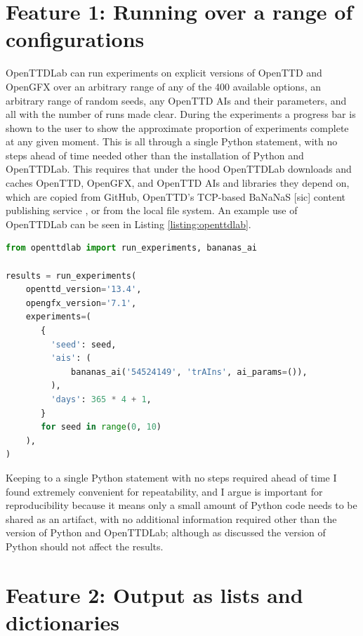 \documentclass[logo,msc,dsti]{style/infthesis}    %
\begin{document}
{\section{Feature 1: Running over a range of configurations}

OpenTTDLab can run experiments on explicit versions of OpenTTD and OpenGFX over an arbitrary range of any of the 400 available options, an arbitrary range of random seeds, any OpenTTD AIs and their parameters, and all with the number of runs made clear. During the experiments a progress bar is shown to the user to show the approximate proportion of experiments complete at any given moment. This is all through a single Python statement, with no steps ahead of time needed other than the installation of Python and OpenTTDLab. This requires that under the hood OpenTTDLab downloads and caches OpenTTD, OpenGFX, and OpenTTD AIs and libraries they depend on, which are copied from GitHub, OpenTTD's TCP-based BaNaNaS [sic] content publishing service \cite{OpenTTDBaNaNaS}, or from the local file system. An example use of OpenTTDLab can be seen in Listing \ref{listing:openttdlab}.

\begin{lstlisting}[label=listing:openttdlab,language=Python, caption={Example usage of OpenTTDLab that runs the trAIns AI, automatically downloaded from BaNaNaS, for a single year of in-game time for random seeds 0 to 9.}]
from openttdlab import run_experiments, bananas_ai

results = run_experiments(
    openttd_version='13.4',
    opengfx_version='7.1',
    experiments=(
       {
         'seed': seed,
         'ais': (
             bananas_ai('54524149', 'trAIns', ai_params=()),
         ),
         'days': 365 * 4 + 1,
       }
       for seed in range(0, 10)
    ),
)
\end{lstlisting}
%
Keeping to a single Python statement with no steps required ahead of time I found extremely convenient for repeatability, and I argue is important for reproducibility because it means only a small amount of Python code needs to be shared as an artifact, with no additional information required other than the version of Python and OpenTTDLab; although as discussed the version of Python should not affect the results.

\section{Feature 2: Output as lists and dictionaries}

}
\end{document}
